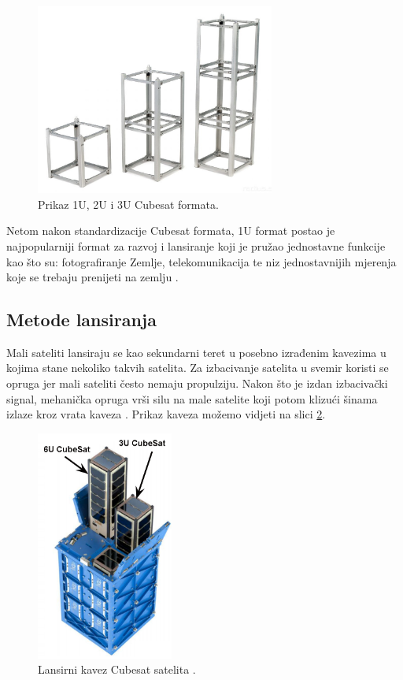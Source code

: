 \documentclass[times, utf8, diplomski, numeric]{templates/template}
\begin{document}
{{{                \begin{figure}[htb]
                \centering
                \includegraphics[width=0.7\textwidth]{images/cubesat_format.jpg}
                \caption{Prikaz 1U, 2U i 3U Cubesat formata.}
                \label{fig:cubesat_format}
                \end{figure}

                Netom nakon standardizacije Cubesat formata, 1U format postao je najpopularniji format za razvoj i lansiranje koji je pružao jednostavne funkcije kao što su: fotografiranje Zemlje, telekomunikacija te niz jednostavnijih mjerenja koje se trebaju prenijeti na zemlju \cite{fersat}.
            }
        }

        \subsection{Metode lansiranja}{
            Mali sateliti lansiraju se kao sekundarni teret u posebno izrađenim kavezima u kojima stane nekoliko takvih satelita. Za izbacivanje satelita u svemir koristi se opruga jer mali sateliti često nemaju propulziju. Nakon što je izdan izbacivački signal, mehanička opruga vrši silu na male satelite koji potom klizući šinama izlaze kroz vrata kaveza \cite{fersat}. Prikaz kaveza možemo vidjeti na slici \ref{fig:kavez}.

            \begin{figure}[htb]
            \centering
            \includegraphics[width=0.4\textwidth]{images/kavez.jpg}
            \caption{Lansirni kavez Cubesat satelita \cite{kavez_cite}.}
            \label{fig:kavez}
            \end{figure}

}}
\end{document}
